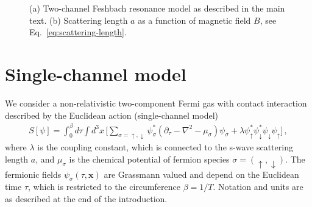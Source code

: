 \begin{figure}[t]
	\centering
	\caption[Feshbach resonance model and scattering length]{(a) Two-channel Feshbach resonance model as described in the main text. (b) Scattering length $a$ as a function of magnetic field $B$, see Eq.~\eqref{eq:scattering-length}.}
	\label{fig:feshbach-resonances}
\end{figure}


\section{Single-channel model}
\label{section:single-channel-model}

We consider a non-relativistic two-component Fermi gas with contact interaction described by the Euclidean action (single-channel model)~\cite{Zwerger2016}
%
\begin{align}
	\label{eq:microscopic-action}
	S[\psi] = \int_{0}^{\beta} d\tau \int d^3 x\,
	\Big[ \sum_{\sigma=\uparrow,\downarrow} \psi_{\sigma}^* (\partial_{\tau} - \nabla^2 - \mu_{\sigma}) \psi_{\sigma}
	+ \lambda \psi_{\uparrow}^*\psi_{\downarrow}^*\psi_{\downarrow}\psi_{\uparrow} \Big] \,,
\end{align}
%
where $\lambda$ is the coupling constant, which is connected to the s-wave scattering length $a$, and $\mu_{\sigma}$ is the chemical potential of fermion species $\sigma = (\uparrow, \downarrow)$.
The fermionic fields $\psi_{\sigma}(\tau,\bm{x})$ are Grassmann valued and depend on the Euclidean time $\tau$, which is restricted to the circumference $\beta=1/T$. Notation and units are as described at the end of the introduction.

